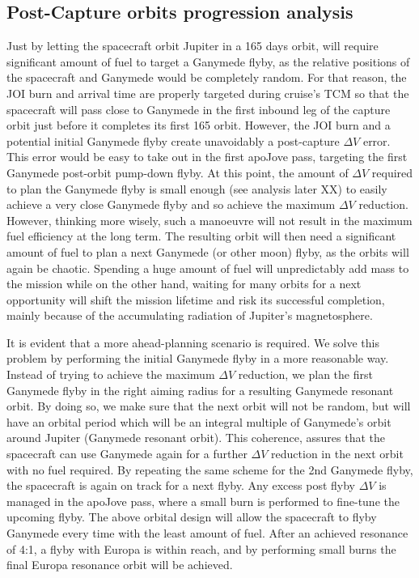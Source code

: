 \subsection{Post-Capture orbits progression analysis}
Just by letting the spacecraft orbit Jupiter in a 165 days orbit, will require significant amount of fuel to target a Ganymede flyby, as the relative positions of the spacecraft and Ganymede would be completely random. For that reason, the JOI burn and arrival time are properly targeted during cruise's TCM so that the spacecraft will pass close to Ganymede in the first inbound leg of the capture orbit just before it completes its first 165 orbit. However, the JOI burn and a potential initial Ganymede flyby create unavoidably a post-capture $\Delta V$ error. This  error would be easy to take out in the first apoJove pass, targeting the first Ganymede post-orbit pump-down flyby. At this point, the amount of $\Delta V$ required to plan the Ganymede flyby is small enough (see analysis later XX) to easily achieve a very close Ganymede flyby and so achieve the maximum $\Delta V$ reduction. However, thinking more wisely, such a manoeuvre will not result in the maximum fuel efficiency at the long term. The resulting orbit will then need a significant amount of fuel to plan a next Ganymede (or other moon) flyby, as the orbits will again be chaotic. Spending a huge amount of fuel will unpredictably add mass to the mission while on the other hand, waiting for many orbits for a next opportunity will shift the mission lifetime and risk its successful completion, mainly because of the accumulating radiation of Jupiter's magnetosphere.

It is evident that a more ahead-planning scenario is required. We solve this problem by performing the initial Ganymede flyby in a more reasonable way. Instead of trying to achieve the maximum $\Delta V$ reduction, we plan the first Ganymede flyby in the right aiming radius for a resulting Ganymede resonant orbit. By doing so, we make sure that the next orbit will not be random, but will have an orbital period which will be an integral multiple of Ganymede's orbit around Jupiter (Ganymede resonant orbit). This coherence, assures that the spacecraft can use Ganymede again for a further $\Delta V$ reduction in the next orbit with no fuel required. By repeating the same scheme for the 2nd Ganymede flyby, the spacecraft is again on track for a next flyby. Any excess post flyby $\Delta V$ is managed in the apoJove pass, where a small burn is performed to fine-tune the upcoming flyby. The above orbital design will allow the spacecraft to flyby Ganymede every time with the least amount of fuel. After an achieved resonance of 4:1, a flyby with Europa is within reach, and by performing small burns the final Europa resonance orbit will be achieved. 
